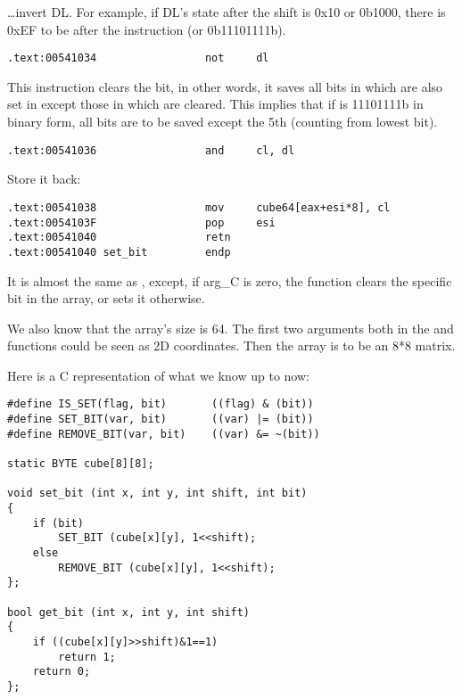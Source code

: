 
\dots invert DL. For example, if DL's state after the shift is 0x10 or 0b1000, 
there is 0xEF to be after the \NOT instruction (or 0b11101111b).

\begin{lstlisting}[style=customasmx86]
.text:00541034                 not     dl
\end{lstlisting}

This instruction clears the bit, in other words, it saves all bits in  which are also set in 
 except those in  which are cleared.
This implies that if  is 11101111b in binary form,
all bits are to be saved except the 5th (counting from lowest bit).

\begin{lstlisting}[style=customasmx86]
.text:00541036                 and     cl, dl
\end{lstlisting}

Store it back:

\begin{lstlisting}[style=customasmx86]
.text:00541038                 mov     cube64[eax+esi*8], cl
.text:0054103F                 pop     esi
.text:00541040                 retn
.text:00541040 set_bit         endp
\end{lstlisting}

It is almost the same as , except, if arg\_C is zero, the function clears the specific bit in the array, 
or sets it otherwise.

We also know that the array's size is 64. The first two arguments both in the  and  functions
could be seen as 2D coordinates. Then the array is to be an 8*8 matrix.

Here is a C representation of what we know up to now:

\begin{lstlisting}[style=customc]
#define IS_SET(flag, bit)       ((flag) & (bit))
#define SET_BIT(var, bit)       ((var) |= (bit))
#define REMOVE_BIT(var, bit)    ((var) &= ~(bit))

static BYTE cube[8][8];

void set_bit (int x, int y, int shift, int bit)
{
	if (bit)
		SET_BIT (cube[x][y], 1<<shift);
	else
		REMOVE_BIT (cube[x][y], 1<<shift);
};

bool get_bit (int x, int y, int shift)
{
	if ((cube[x][y]>>shift)&1==1)
		return 1;
	return 0;
};
\end{lstlisting}

